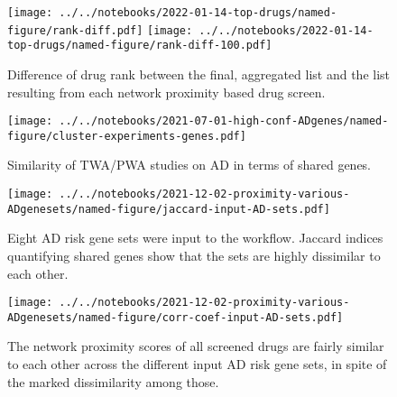 \documentclass[letterpaper]{article}
\begin{document}
\begin{figure}[p]
\texttt{[image: ../../notebooks/2022-01-14-top-drugs/named-figure/rank-diff.pdf]}
\texttt{[image: ../../notebooks/2022-01-14-top-drugs/named-figure/rank-diff-100.pdf]}
\caption{
Difference of drug rank between the final, aggregated list and the list
resulting from each network proximity based drug screen.
}
\label{fig:rank-diff}
\end{figure}


\begin{figure}
\texttt{[image: ../../notebooks/2021-07-01-high-conf-ADgenes/named-figure/cluster-experiments-genes.pdf]}
\caption{
Similarity of TWA/PWA studies on AD in terms of shared genes.
}
\label{fig:twas-clustermap}
\end{figure}


\begin{figure}[p]
\texttt{[image: ../../notebooks/2021-12-02-proximity-various-ADgenesets/named-figure/jaccard-input-AD-sets.pdf]}
\caption{
Eight AD risk gene sets were input to the workflow.
  Jaccard indices quantifying shared genes show that the sets are highly
  dissimilar to each other.
}
\label{fig:gset-jaccard}
\end{figure}


\begin{figure}[p]
\texttt{[image: ../../notebooks/2021-12-02-proximity-various-ADgenesets/named-figure/corr-coef-input-AD-sets.pdf]}
\caption{
The network proximity scores of all
  screened drugs are fairly similar to each other across the different input
  AD risk gene sets, in spite of the marked dissimilarity among those.
}
\label{fig:gset-corr}
\end{figure}


\end{document}
